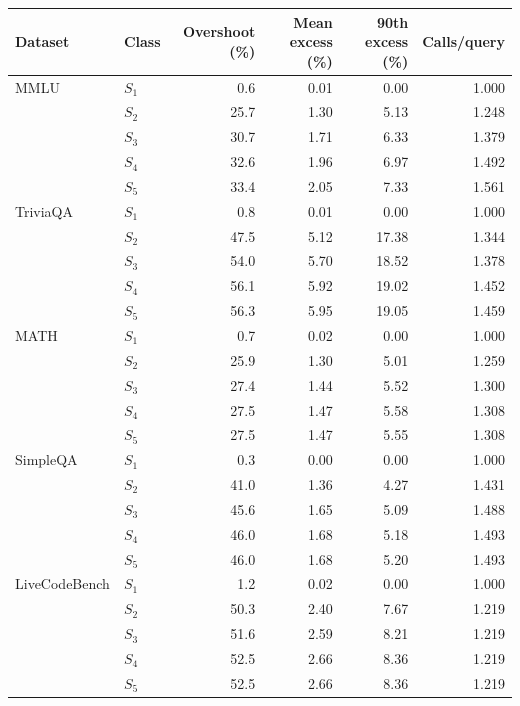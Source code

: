 \begin{tabular}{llrrrr}
\toprule
Dataset & Class & Overshoot (\%) & Mean excess (\%) & 90th excess (\%) & Calls/query \\
\midrule
MMLU & $S_1$ & 0.6 & 0.01 & 0.00 & 1.000 \\
 & $S_2$ & 25.7 & 1.30 & 5.13 & 1.248 \\
 & $S_3$ & 30.7 & 1.71 & 6.33 & 1.379 \\
 & $S_4$ & 32.6 & 1.96 & 6.97 & 1.492 \\
 & $S_5$ & 33.4 & 2.05 & 7.33 & 1.561 \\
TriviaQA & $S_1$ & 0.8 & 0.01 & 0.00 & 1.000 \\
 & $S_2$ & 47.5 & 5.12 & 17.38 & 1.344 \\
 & $S_3$ & 54.0 & 5.70 & 18.52 & 1.378 \\
 & $S_4$ & 56.1 & 5.92 & 19.02 & 1.452 \\
 & $S_5$ & 56.3 & 5.95 & 19.05 & 1.459 \\
MATH & $S_1$ & 0.7 & 0.02 & 0.00 & 1.000 \\
 & $S_2$ & 25.9 & 1.30 & 5.01 & 1.259 \\
 & $S_3$ & 27.4 & 1.44 & 5.52 & 1.300 \\
 & $S_4$ & 27.5 & 1.47 & 5.58 & 1.308 \\
 & $S_5$ & 27.5 & 1.47 & 5.55 & 1.308 \\
SimpleQA & $S_1$ & 0.3 & 0.00 & 0.00 & 1.000 \\
 & $S_2$ & 41.0 & 1.36 & 4.27 & 1.431 \\
 & $S_3$ & 45.6 & 1.65 & 5.09 & 1.488 \\
 & $S_4$ & 46.0 & 1.68 & 5.18 & 1.493 \\
 & $S_5$ & 46.0 & 1.68 & 5.20 & 1.493 \\
LiveCodeBench & $S_1$ & 1.2 & 0.02 & 0.00 & 1.000 \\
 & $S_2$ & 50.3 & 2.40 & 7.67 & 1.219 \\
 & $S_3$ & 51.6 & 2.59 & 8.21 & 1.219 \\
 & $S_4$ & 52.5 & 2.66 & 8.36 & 1.219 \\
 & $S_5$ & 52.5 & 2.66 & 8.36 & 1.219 \\
\bottomrule
\end{tabular}
